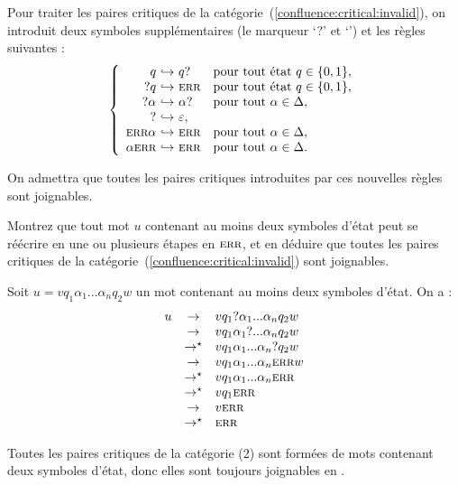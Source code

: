 \begin{exercice}
  Pour traiter les paires critiques de la catégorie~(\ref{confluence:critical:invalid}),
  on introduit deux symboles supplémentaires (le marqueur `?' et `\ERR{}') et les règles suivantes : 
  $$
  \left\{\begin{array}{r@{~\hookrightarrow~}ll}
  q   & q ?  & \text{pour tout état } q \in \{0,1\},\\
  ? q & \ERR & \text{pour tout état } q \in \{0,1\},\\
  ? \alpha & \alpha ? & \text{pour tout } \alpha\in\Delta,\\
  ? & \varepsilon,\\
  \ERR \alpha & \ERR & \text{pour tout } \alpha\in\Delta,\\
  \alpha \ERR & \ERR & \text{pour tout } \alpha\in\Delta.\\
  \end{array}\right.
  $$

  On admettra que toutes les paires critiques introduites par ces nouvelles règles sont joignables.

  \begin{questions}
  \item Montrez que tout mot $u$ contenant au moins deux symboles d'état peut se réécrire en une ou plusieurs étapes en $\textsc{err}$,
    et en déduire que toutes les paires critiques de la catégorie~(\ref{confluence:critical:invalid}) sont joignables.
  \end{questions}
  \begin{corrections}
    Soit $u = v q_1 \alpha_1 ... \alpha_n q_2 w$ un mot contenant au moins deux symboles d'état. On a :
    $$
    \begin{array}{rcl}
      u &\rightarrow& v q_1 ? \alpha_1 ... \alpha_n q_2 w \\
      &\rightarrow& v q_1 \alpha_1 ? ... \alpha_n q_2 w \\
      &\rightarrow^\star& v q_1 \alpha_1 ... \alpha_n ? q_2 w \\
      &\rightarrow& v q_1 \alpha_1 ... \alpha_n \textsc{err} w \\
      &\rightarrow^\star& v q_1 \alpha_1 ... \alpha_n \textsc{err} \\
      &\rightarrow^\star& v q_1 \textsc{err} \\
      &\rightarrow& v \textsc{err} \\
      &\rightarrow^\star& \textsc{err}
    \end{array}
    $$

    Toutes les paires critiques de la catégorie (2) sont formées de mots contenant deux symboles d'état, donc elles sont toujours joignables en \ERR. 
  \end{corrections}


\end{exercice}
